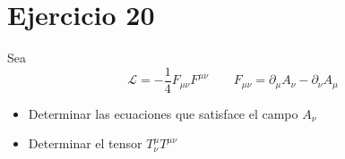 \section*{Ejercicio 20}
Sea 
\begin{equation*}
    \mathcal{L } = -\frac{1}{4}F_{\mu\nu}F^{\mu\nu} \qquad F_{\mu \nu}= \partial_\mu A_\nu - \partial_\nu A_\mu
\end{equation*}
\begin{itemize}
    \item Determinar las ecuaciones que satisface el campo $A_\nu$
    \item Determinar el tensor $T^\mu_\nu T^{\mu\nu}$
\end{itemize}